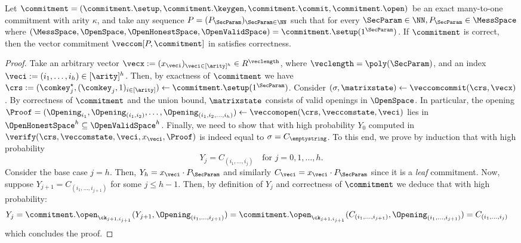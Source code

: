     \begin{lemma}\label{lem:VC-correctness}
    Let  $\commitment = (\commitment.\setup, \commitment.\keygen,\commitment.\commit,\commitment.\open)$ be an exact many-to-one commitment with arity $\kappa$, and take any sequence $P = (P_\SecParam)_{\SecParam \in \NN}$ such that for every $\SecParam \in \NN, P_\SecParam \in \MessSpace$ where $ (\MessSpace,\OpenSpace,\OpenHonestSpace,\OpenValidSpace) = \commitment.\setup(1^\SecParam)$. If $\commitment$ is correct, then the vector commitment $\veccom[P,\commitment]$ in  satisfies correctness.
    \end{lemma}
    \begin{proof}
     Take an arbitrary vector $\vecx := (x_{\veci})_{\veci \in [\arity]^h} \in R^{\veclength}$, where $\veclength = \poly(\SecParam)$, and an index $\veci := (i_1,\ldots,i_h) \in [\arity]^h$. Then, by exactness of $\commitment$ we have $\crs :=(\comkey^\star_j,(\comkey_{j},1)_{i\in [\arity]}) \gets \commitment.\setup(1^\SecParam)$. Consider $(\sigma,\matrixstate) \gets \veccomcommit(\crs,\vecx)$. By correctness of $\commitment$ and the union bound, $\matrixstate$ consists of valid openings in $\OpenSpace$. In particular, the opening $\Proof = (\Opening_{i_1},\Opening_{(i_1,i_2)},\ldots,\Opening_{(i_1,i_2,\ldots,i_h)}) \gets \veccomopen(\crs, \veccomstate, \veci)$ lies in $\OpenHonestSpace^h \subseteq \OpenValidSpace^h$. Finally, we need to show that with high probability $Y_0$ computed in $\verify(\crs, \veccomstate, \veci,x_{\veci},\Proof)$ is indeed equal to $\sigma = C_\emptystring$. To this end, we prove by induction that with high probability \[Y_j = C_{(i_1,\ldots,i_{j})} \quad \text{for } j=0,1,\ldots,h.\]
    Consider the base case $j=h$. Then, $Y_h = x_{\veci} \cdot P_\SecParam$ and similarly $C_\veci = x_{\veci} \cdot P_\SecParam$ since it is a \textit{leaf} commitment. Now, suppose $Y_{j+1} = C_{(i_1,\ldots,i_{j+1})}$ for some $j \leq h-1$. Then, by definition of $Y_j$ and correctness of $\commitment$ we deduce that with high probability:
    \begin{align*}
        Y_j &=  \commitment.\open_{\ck_{j+1,i_{j+1}}}(Y_{j+1}, \Opening_{(i_1,\ldots,i_{j+1})}) =  \commitment.\open_{\ck_{j+1,i_{j+1}}}(C_{(i_1,\ldots,i_{j+1})},  \Opening_{(i_1,\ldots,i_{j+1})}) =  C_{(i_1,\ldots,i_{j})}
    \end{align*}
     which concludes the proof.
    \end{proof}
    
